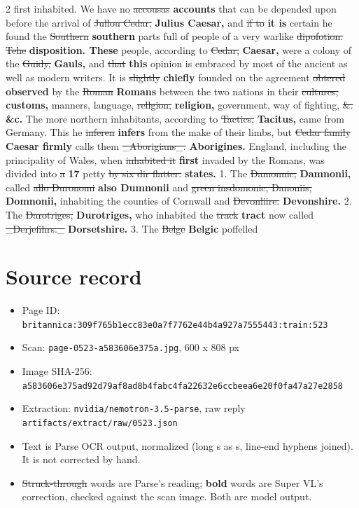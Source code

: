 \documentclass[10pt]{article}
\begin{document}
\begin{multicols}{2}
first inhabited. We have no \sout{accousas} \textbf{accounts} that can be depended upon before the arrival of \sout{Jullou Cedar,} \textbf{Julius Caesar,} and \sout{if to} \textbf{it is} certain he found the \sout{Southern} \textbf{southern} parts full of people of a very warlike \sout{dipofotion. Tehe} \textbf{disposition. These} people, according to \sout{Cedar,} \textbf{Caesar,} were a colony of the \sout{Guidy,} \textbf{Gauls,} and \sout{that} \textbf{this} opinion is embraced by most of the ancient as well as modern writers. It is \sout{slightly} \textbf{chiefly} founded on the agreement \sout{obtered} \textbf{observed} by the \sout{Roman} \textbf{Romans} between the two nations in their \sout{cultures,} \textbf{customs,} manners, language, \sout{rellgion,} \textbf{religion,} government, way of fighting, \sout{\&.} \textbf{\&c.} The more northern inhabitants, according to \sout{Tactics,} \textbf{Tacitus,} came from Germany. This he \sout{inferen} \textbf{infers} from the make of their limbs, but \sout{Cedar family} \textbf{Caesar firmly} calls them \sout{\_Aborigians\_.} \textbf{Aborigines.} England, including the principality of Wales, when \sout{inhabited it} \textbf{first} invaded by the Romans, was divided into \sout{a} \textbf{17} petty \sout{by six dir flatter.} \textbf{states.} 1. The \sout{Damonnic,} \textbf{Damnonii,} called \sout{allo Duronomi} \textbf{also Dumnonii} and \sout{green insdomonic, Danoniis,} \textbf{Domnonii,} inhabiting the counties of Cornwall and \sout{Devonliire.} \textbf{Devonshire.} 2. The \sout{Darotriges,} \textbf{Durotriges,} who inhabited the \sout{track} \textbf{tract} now called \sout{\_Derjefihrs.\_} \textbf{Dorsetshire.} 3. The \sout{Belge} \textbf{Belgic} poffelled
\end{multicols}
\section*{Source record}
\begin{itemize}
\item Page ID: \texttt{britannica:309f765b1ecc83e0a7f7762e44b4a927a7555443:train:523}
\item Scan: \texttt{page-0523-a583606e375a.jpg}, 600 x 808 px
\item Image SHA-256: \texttt{\small a583606e375ad92d79af8ad8b4fabc4fa22632e6ccbeea6e20f0fa47a27e2858}
\item Extraction: \texttt{nvidia/nemotron-3.5-parse}, raw reply \texttt{artifacts/extract/raw/0523.json}
\item Text is Parse OCR output, normalized (long s as s, line-end hyphens joined). It is not corrected by hand.
\item \sout{Struck-through} words are Parse's reading; \textbf{bold} words are Super VL's correction, checked against the scan image. Both are model output.
\end{itemize}
\end{document}
